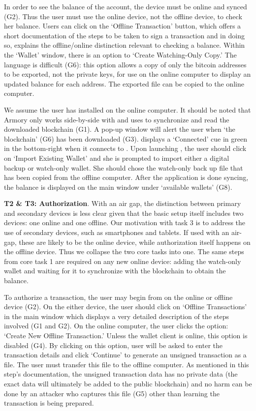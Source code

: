 In order to see the balance of the account, the device must be online and synced (G2). Thus the user must use the online device, not the offline device, to check her balance. Users can click on the `Offline Transaction' button, which offers a short documentation of the steps to be taken to sign a transaction and in doing so, explains the offline/online distinction relevant to checking a balance. Within the `Wallet' window, there is an option to `Create Watching-Only Copy.' The language is difficult (G6): this option allows a copy of only the bitcoin addresses to be exported, not the private keys, for use on the online computer to display an updated balance for each address. The exported file can be copied to the online computer.

We assume the user has installed \armory on the online computer. It should be noted that Armory only works side-by-side with \bitcoinclient and uses \bitcoinclient to synchronize and read the downloaded blockchain (G1). A pop-up window will alert the user when `the blockchain' (G6) has been downloaded (G3). \armory displays a `Connected' cue in green in the bottom-right when it connects to \bitcoinclient. Upon launching \armory, the user should click on `Import Existing Wallet' and she is prompted to import either a digital backup or watch-only wallet. She should chose the watch-only back up file that has been copied from the offline computer. After the application is done syncing, the balance is displayed on the main window under `available wallets' (G8).

\textbf{T2 \& T3: Authorization}.
With an air gap, the distinction between primary and secondary devices is less clear given that the basic setup itself includes two devices: one online and one offline. Our motivation with task 3 is to address the use of secondary devices, such as smartphones and tablets. If used with an air-gap, these are likely to be the online device, while authorization itself happens on the offline device. Thus we collapse the two core tasks into one. The same steps from core task 1 are required on any new online device: adding the watch-only wallet and waiting for it to synchronize with the blockchain to obtain the balance.

To authorize a transaction, the user may begin from \armory on the online or offline device (G2). On the either device, the user should click on `Offline Transactions' in the main window which displays a very detailed description of the steps involved (G1 and G2). On the online computer, the user clicks the option: `Create New Offline Transaction.' Unless the wallet client is online, this option is disabled (G4). By clicking on this option, user will be asked to enter the transaction details and click `Continue' to generate an unsigned transaction as a file. The user must transfer this file to the offline computer. As mentioned in this step's documentation, the unsigned transaction data has no private data (the exact data will ultimately be added to the public blockchain) and no harm can be done by an attacker who captures this file (G5) other than learning the transaction is being prepared.

